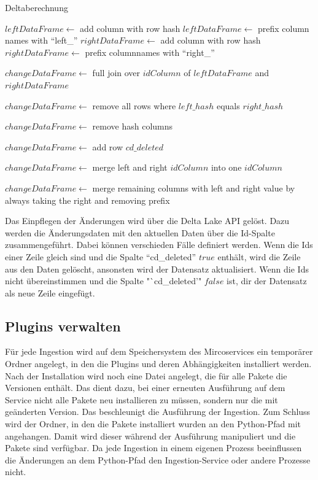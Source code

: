 \begin{algorithm}
    \caption{Deltaberechnung}
    \label{algo:delta-calc}
    $leftDataFrame \gets$ add column with row hash \;
    $leftDataFrame \gets$ prefix column names with "`left\_"' \;
    $rightDataFrame \gets$ add column with row hash \;
    $rightDataFrame \gets$ prefix columnnames with "`right\_"' \;

    $changeDataFrame \gets$ full join over $idColumn$ of $leftDataFrame$ and $rightDataFrame$ \;

    $changeDataFrame \gets$ remove all rows where $left\_hash$ equals $right\_hash$ \;

    $changeDataFrame \gets$ remove hash columns

    $changeDataFrame \gets$ add row $cd\_deleted$ \;

    $changeDataFrame \gets$ merge left and right $idColumn$ into one $idColumn$

    $changeDataFrame \gets$ merge remaining columns with left and right value by always taking the right and removing prefix

\end{algorithm}

Das Einpflegen der Änderungen wird über die Delta Lake API gelöst.
Dazu werden die Änderungsdaten mit den aktuellen Daten über die Id-Spalte zusammengeführt.
Dabei können verschieden Fälle definiert werden.
Wenn die Ids einer Zeile gleich sind und die Spalte "`cd\_deleted"' $true$ enthält, wird die Zeile aus den Daten gelöscht, ansonsten wird der Datensatz aktualisiert.
Wenn die Ids nicht übereinstimmen und die Spalte "`cd\_deleted'" $false$ ist, dir der Datensatz als neue Zeile eingefügt.

\subsection{Plugins verwalten}
Für jede Ingestion wird auf dem Speichersystem des Mircoservices ein temporärer Ordner angelegt, in den die Plugins und deren Abhängigkeiten installiert werden.
Nach der Installation wird noch eine Datei angelegt, die für alle Pakete die Versionen enthält.
Das dient dazu, bei einer erneuten Ausführung auf dem Service nicht alle Pakete neu installieren zu müssen, sondern nur die mit geänderten Version.
Das beschleunigt die Ausführung der Ingestion.
Zum Schluss wird der Ordner, in den die Pakete installiert wurden an den Python-Pfad mit angehangen.
Damit wird dieser während der Ausführung manipuliert und die Pakete sind verfügbar.
Da jede Ingestion in einem eigenen Prozess beeinflussen die Änderungen an dem Python-Pfad den Ingestion-Service oder andere Prozesse nicht.

